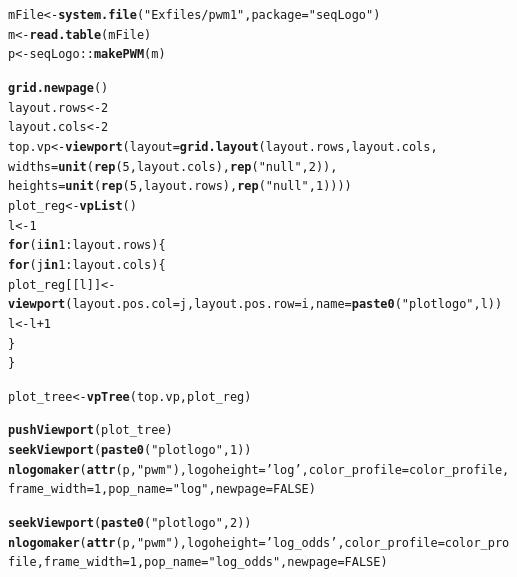 \documentclass[12pt]{article}\usepackage[]{graphicx}\usepackage[usenames,dvipsnames]{color}
\makeatletter
\newcommand{\hlnum}[1]{\textcolor[rgb]{0.686,0.059,0.569}{#1}}%
\newcommand{\hlstr}[1]{\textcolor[rgb]{0.192,0.494,0.8}{#1}}%
\newcommand{\hlopt}[1]{\textcolor[rgb]{0,0,0}{#1}}%
\newcommand{\hlstd}[1]{\textcolor[rgb]{0.345,0.345,0.345}{#1}}%
\newcommand{\hlkwa}[1]{\textcolor[rgb]{0.161,0.373,0.58}{\textbf{#1}}}%
\newcommand{\hlkwb}[1]{\textcolor[rgb]{0.69,0.353,0.396}{#1}}%
\newcommand{\hlkwc}[1]{\textcolor[rgb]{0.333,0.667,0.333}{#1}}%
\newcommand{\hlkwd}[1]{\textcolor[rgb]{0.737,0.353,0.396}{\textbf{#1}}}%
\newenvironment{kframe}{%
 \def\at@end@of@kframe{}%
 \ifinner\ifhmode%
  \def\at@end@of@kframe{\end{minipage}}%
  \begin{minipage}{\columnwidth}%
 \fi\fi%
 \def\FrameCommand##1{\hskip\@totalleftmargin \hskip-\fboxsep
 \colorbox{shadecolor}{##1}\hskip-\fboxsep
     \hskip-\linewidth \hskip-\@totalleftmargin \hskip\columnwidth}%
 \MakeFramed {\advance\hsize-\width
   \@totalleftmargin\z@ \linewidth\hsize
   \@setminipage}}%
 {\par\unskip\endMakeFramed%
 \at@end@of@kframe}
\newenvironment{knitrout}{}{} %
\makeatother
\begin{document}
\begin{knitrout}
\color{fgcolor}\begin{kframe}
\begin{alltt}
\hlstd{mFile} \hlkwb{<-} \hlkwd{system.file}\hlstd{(}\hlstr{"Exfiles/pwm1"}\hlstd{,} \hlkwc{package}\hlstd{=}\hlstr{"seqLogo"}\hlstd{)}
\hlstd{m} \hlkwb{<-} \hlkwd{read.table}\hlstd{(mFile)}
\hlstd{p} \hlkwb{<-} \hlstd{seqLogo}\hlopt{::}\hlkwd{makePWM}\hlstd{(m)}

\hlkwd{grid.newpage}\hlstd{()}
\hlstd{layout.rows} \hlkwb{<-} \hlnum{2}
\hlstd{layout.cols} \hlkwb{<-} \hlnum{2}
\hlstd{top.vp} \hlkwb{<-} \hlkwd{viewport}\hlstd{(}\hlkwc{layout}\hlstd{=}\hlkwd{grid.layout}\hlstd{(layout.rows, layout.cols,}
                                      \hlkwc{widths}\hlstd{=}\hlkwd{unit}\hlstd{(}\hlkwd{rep}\hlstd{(}\hlnum{5}\hlstd{,layout.cols),} \hlkwd{rep}\hlstd{(}\hlstr{"null"}\hlstd{,} \hlnum{2}\hlstd{)),}
                                      \hlkwc{heights}\hlstd{=}\hlkwd{unit}\hlstd{(}\hlkwd{rep}\hlstd{(}\hlnum{5}\hlstd{,layout.rows),} \hlkwd{rep}\hlstd{(}\hlstr{"null"}\hlstd{,} \hlnum{1}\hlstd{))))}
\hlstd{plot_reg} \hlkwb{<-} \hlkwd{vpList}\hlstd{()}
\hlstd{l} \hlkwb{<-} \hlnum{1}
\hlkwa{for}\hlstd{(i} \hlkwa{in} \hlnum{1}\hlopt{:}\hlstd{layout.rows)\{}
  \hlkwa{for}\hlstd{(j} \hlkwa{in} \hlnum{1}\hlopt{:}\hlstd{layout.cols)\{}
    \hlstd{plot_reg[[l]]} \hlkwb{<-} \hlkwd{viewport}\hlstd{(}\hlkwc{layout.pos.col} \hlstd{= j,} \hlkwc{layout.pos.row} \hlstd{= i,} \hlkwc{name} \hlstd{=} \hlkwd{paste0}\hlstd{(}\hlstr{"plotlogo"}\hlstd{, l))}
    \hlstd{l} \hlkwb{<-} \hlstd{l}\hlopt{+}\hlnum{1}
  \hlstd{\}}
\hlstd{\}}


\hlstd{plot_tree} \hlkwb{<-} \hlkwd{vpTree}\hlstd{(top.vp, plot_reg)}

\hlkwd{pushViewport}\hlstd{(plot_tree)}
\hlkwd{seekViewport}\hlstd{(}\hlkwd{paste0}\hlstd{(}\hlstr{"plotlogo"}\hlstd{,} \hlnum{1}\hlstd{))}
\hlkwd{nlogomaker}\hlstd{(}\hlkwd{attr}\hlstd{(p,} \hlstr{"pwm"}\hlstd{),}\hlkwc{logoheight} \hlstd{=} \hlstr{'log'}\hlstd{,}\hlkwc{color_profile} \hlstd{= color_profile,}\hlkwc{frame_width} \hlstd{=} \hlnum{1}\hlstd{,} \hlkwc{pop_name} \hlstd{=} \hlstr{"log"}\hlstd{,} \hlkwc{newpage} \hlstd{=} \hlnum{FALSE}\hlstd{)}


\hlkwd{seekViewport}\hlstd{(}\hlkwd{paste0}\hlstd{(}\hlstr{"plotlogo"}\hlstd{,} \hlnum{2}\hlstd{))}
\hlkwd{nlogomaker}\hlstd{(}\hlkwd{attr}\hlstd{(p,} \hlstr{"pwm"}\hlstd{),}\hlkwc{logoheight} \hlstd{=} \hlstr{'log_odds'}\hlstd{,}\hlkwc{color_profile} \hlstd{= color_profile,}\hlkwc{frame_width} \hlstd{=} \hlnum{1}\hlstd{,} \hlkwc{pop_name} \hlstd{=} \hlstr{"log_odds"}\hlstd{,} \hlkwc{newpage} \hlstd{=} \hlnum{FALSE}\hlstd{)}


\end{alltt}
\end{kframe}
\end{knitrout}
\end{document}
